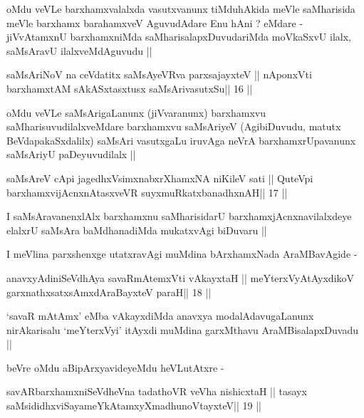 \begin{artha}
oMdu veVLe barxhamxvalalxda vasutxvanunx tiMduhAkida meVle saMharisida
meVle barxhamx barahamxveV AguvudAdare Enu hAni ? eMdare - jiVvAtamxnU
barxhamxniMda saMharisalapxDuvudariMda moVkaSxvU ilalx, saMsAravU
ilalxveMdAguvudu ||
\end{artha}

\begin{shl}
saMsAriNoV na ceVdatitx saMsAyeVRva parxsajayxteV ||
nA\s ponxVti barxhamxtAM sAkASxtasxtusx saMsArivasutxSu\hfill || 16 ||
\end{shl}

\begin{artha}
oMdu veVLe saMsArigaLanunx (jiVvaranunx) barxhamxvu
saMharisuvudilalxveMdare barxhamxvu saMsAriyeV (AgibiDuvudu, matutx
BeVdapakaSxdalilx) saMsAri vasutxgaLu iruvAga neVrA barxhamxrUpavanunx
saMsAriyU paDeyuvudilalx ||
\end{artha}

\begin{shl}
saMsAreV cApi jagedhxV\s simxnabxrXhamxNA niKileV sati ||
QuteV\s pi barxhamxvijAcnxnAtasxveVR suyxmuRkatxbanadhxnAH\hfill || 17 ||
\end{shl}

\begin{artha}
I saMsAravanenxlAlx barxhamxnu saMharisidarU barxhamxjAcnxnavilalxdeye
elalxrU saMsAra baMdhanadiMda mukatxvAgi biDuvaru ||
\end{artha}

\begin{artha}
I meVlina parxshenxge utatxravAgi muMdina bArxhamxNada AraMBavAgide -
\end{artha}

\begin{shl}
anavxyAdiniSeVdhAya savaRmAtemxVti vAkayxtaH ||
meYterxVyAtAyxdikoV garxnathxsatxsAmxdAraBayxteV paraH\hfill || 18 ||
\end{shl}

\begin{artha}
`savaR mAtAmx' eMba vAkayxdiMda anavxya modalAdavugaLanunx
  nirAkarisalu `meYterxVyi' itAyxdi muMdina garxMthavu
  AraMBisalapxDuvadu ||

beVre oMdu aBipArxyavideyeMdu heVLutAtxre -
\end{artha}

\begin{shl}
savARbarxhamxniSeVdheVna tadathoVR veVha nishicxtaH ||
tasayx saMsididhxviSayameYkAtamxyXmadhunoVtayxteV\hfill || 19 ||
\end{shl}

